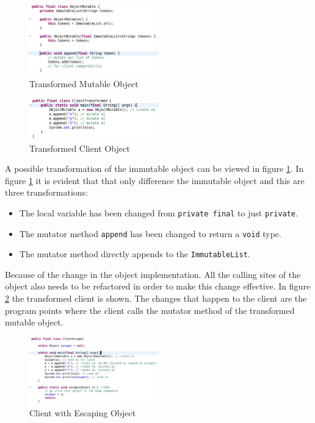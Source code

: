 \begin{figure}[H]
	\caption{Transformed Mutable Object} \label{fig:mutableobj}
	\includegraphics[width=0.5\textwidth]{img/mutable_object}
\end{figure}

\begin{figure}[H]
	\caption{Transformed Client Object} \label{fig:transformedclient}
	\includegraphics[width=0.5\textwidth]{img/client_transformed}
\end{figure}

A possible transformation of the immutable object can be viewed in figure \ref{fig:mutableobj}. In figure \ref{fig:mutableobj} it is evident that that only difference the immutable object and this are three transformations:
\begin{itemize}
\item The local variable has been changed from \texttt{private final} to just \texttt{private}.
\item The mutator method \texttt{append} has been changed to return a \texttt{void} type.
\item The mutator method directly appends to the \texttt{ImmutableList}.
\end{itemize}

Because of the change in the object implementation. All the calling sites of the object also needs to be refactored in order to make this change effective. In figure \ref{fig:transformedclient} the transformed client is shown. The changes that happen to the client are the program points where the client calls the mutator method of the transformed mutable object.

\begin{figure}[H]
	\caption{Client with Escaping Object} \label{fig:client_escape}
	\includegraphics[width=0.5\textwidth]{img/client_escape}
\end{figure}

